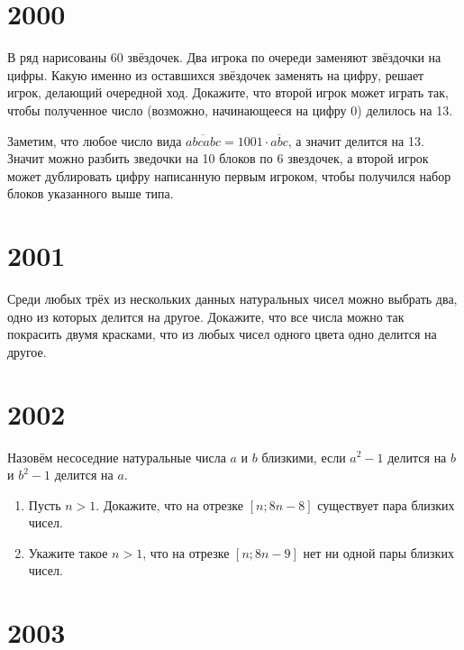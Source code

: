 \documentclass[11pt, a4paper]{template}
\begin{document}
\chapter{2000}

\begin{exercise}[M1731]
В ряд нарисованы 60 звёздочек. Два игрока по очереди заменяют звёздочки на цифры. Какую именно из оставшихся звёздочек заменять на цифру, решает игрок, делающий очередной ход. Докажите, что второй игрок может играть так, чтобы полученное число (возможно, начинающееся на цифру 0) делилось на 13.
\end{exercise}

\begin{solution}
Заметим, что любое число вида $\overline{abcabc} = 1001 \cdot \overline{abc}$, а значит делится на 13. Значит можно разбить зведочки на 10 блоков по 6 звездочек, а второй игрок может дублировать цифру написанную первым игроком, чтобы получился набор блоков указанного выше типа. 
\end{solution}

\chapter{2001}

\begin{exercise}[M1756]
Среди любых трёх из нескольких данных натуральных чисел можно выбрать два, одно из которых делится на другое. Докажите, что все числа можно так покрасить двумя красками, что из любых чисел одного цвета одно делится на другое.
\end{exercise}

\chapter{2002}

\begin{exercise}
Назовём несоседние натуральные числа $a$ и $b$ близкими, если $a^{2} - 1$ делится на $b$ и $b^{2} - 1$ делится на $a$.
\begin{enumerate}
\item Пусть $n > 1$. Докажите, что на отрезке $[n; 8n - 8]$ существует пара близких чисел.
\item Укажите такое $n > 1$, что на отрезке $[n; 8n - 9]$ нет ни одной пары близких чисел.
\end{enumerate} 
\end{exercise}

\chapter{2003}
\end{document}
